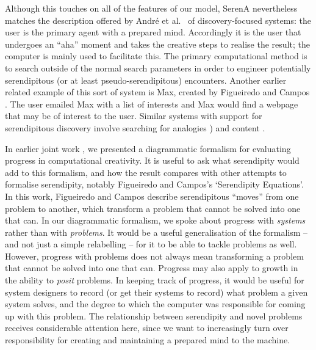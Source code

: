 Although this touches on all of the features of our model, {\sf
  SerenA} nevertheless matches the description offered by Andr{\'e} et
al.~\citeyear{andre2009discovery} of discovery-focused systems: the
user is the primary agent with a prepared mind.  Accordingly it is the
user that undergoes an ``aha'' moment and takes the creative steps to
realise the result; the computer is mainly used to facilitate this.
The primary computational method is to search outside of the normal
search parameters in order to engineer potentially serendipitous (or
at least pseudo-serendipitous) encounters.  Another earlier related
example of this sort of system is {\sf Max}, created by Figueiredo and
Campos \citeyear{Campos2002}.  The user emailed {\sf Max} with a list
of interests and {\sf Max} would find a webpage that may be of
interest to the user.  Similar systems with support for serendipitous
discovery involve searching for analogies
\cite{Donoghue2002,Donoghue2012}) and content \cite{Iaquinta2008}.

In earlier joint work \cite{colton-assessingprogress}, we presented a
diagrammatic formalism for evaluating progress in computational
creativity.  It is useful to ask what serendipity would add to this
formalism, and how the result compares with other attempts to
formalise serendipity, notably Figueiredo and Campos's
\citeyear{Figueiredo2001} `Serendipity Equations'.  In this work,
Figueiredo and Campos describe serendipitous ``moves'' from one
problem to another, which transform a problem that cannot be solved
into one that can.  In our diagrammatic formalism, we spoke about
progress with \emph{systems} rather than with \emph{problems}.  It
would be a useful generalisation of the formalism -- and not just a
simple relabelling -- for it to be able to tackle problems as well.
However, progress with problems does not always mean transforming a
problem that cannot be solved into one that can.  Progress may also
apply to growth in the ability to \emph{posit} problems.  In keeping
track of progress, it would be useful for system designers to record
(or get their systems to record) what problem a given system solves,
and the degree to which the computer was responsible for coming up
with this problem.  The relationship between serendipity and novel
problems receives considerable attention here, since we want to
increasingly turn over responsibility for creating and maintaining a
prepared mind to the machine.

